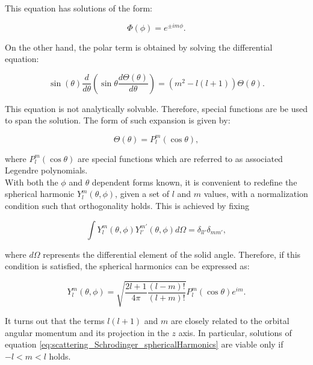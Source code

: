 \documentclass[openany]{book}
\begin{document}
This equation has solutions of the form: 

\begin{equation}\label{eq:scattering_Schrodinger_azimuthal_solution}
	\Phi(\phi) = e^{\pm im \phi}.
\end{equation}

On the other hand, the polar term is obtained by solving the differential equation: 

\begin{equation}\label{eq:scattering_Schrodinger_polar}
	\sin(\theta) \frac{d}{d\theta} \left( \sin \theta \frac{d\Theta(\theta)}{d\theta}\right) =  (m^2 - l(l+1) ) \Theta(\theta).
\end{equation}

This equation is not analytically solvable. Therefore, special functions are be used to span the solution. The form of such expansion is given by: 

\begin{equation}\label{eq:scattering_Schrodinger_polar_solution}
	\Theta(\theta) = P_l^{m}(\cos \theta), 
\end{equation}

where $P_l^{m}(\cos \theta)$ are special functions which are referred to as associated Legendre polynomials. \\

With both the $\phi$ and $\theta$ dependent forms known, it is convenient to redefine the spherical harmonic $	Y_{l}^{m}(\theta, \phi)$, given a set of $l$ and $m$ values, with a normalization condition such that orthogonality holds. This is achieved by fixing

\begin{equation}
	\int {Y_{l}^{m}(\theta, \phi) Y_{l'}^{m'}(\theta, \phi) d \Omega} = \delta_{ll'}\delta_{mm'},
\end{equation}

where $d\Omega$ represents the differential element of the solid angle. Therefore, if this condition is satisfied, the spherical harmonics can be expressed as:

\begin{equation}\label{eq:scattering_Schrodinger_sphericalHarmonics}
	Y_{l}^{m}(\theta, \phi) = \sqrt{\frac{2l + 1}{4 \pi} \frac{(l - m)!}{(l+m)!}}  P_l^{m}(\cos \theta) e^{im}. 
\end{equation}

It turns out that the terms $l(l+1)$ and $m$ are closely related to the orbital angular momentum and its projection in the $z$ axis. In particular, solutions of equation \ref{eq:scattering_Schrodinger_sphericalHarmonics} are viable only if $-l < m < l $ holds. \\
\end{document}
